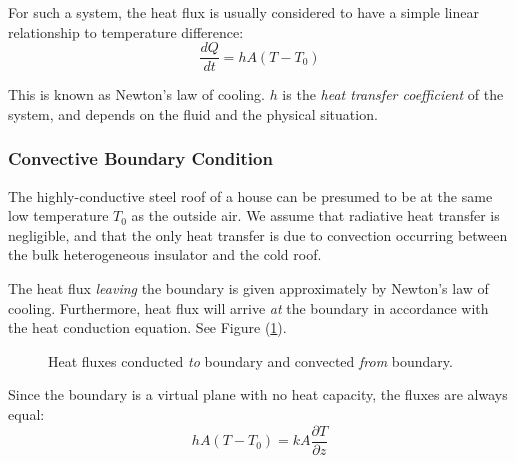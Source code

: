 \documentclass[12pt, a4paper, twoside, openright]{book}
\begin{document}
For such a system, the heat flux is usually considered to have a simple linear relationship to temperature difference:
\begin{equation}
\frac{dQ}{dt} = h A (T - T_0)
\end{equation}

This is known as Newton's law of cooling. $h$ is the \emph{heat transfer coefficient} of the system, and depends on the fluid and the physical situation.

\subsubsection{Convective Boundary Condition}

The highly-conductive steel roof of a house can be presumed to be at the same low temperature $T_0$ as the outside air. We assume that radiative heat transfer is negligible, and that the only heat transfer is due to convection occurring between the bulk heterogeneous insulator and the cold roof. 

The heat flux \emph{leaving} the boundary is given approximately by Newton's law of cooling.
Furthermore, heat flux will arrive \emph{at} the boundary in accordance with the heat conduction equation.  See Figure (\ref{boundaryflux}).

\begin{figure}[ht]
\centering
{}
\caption{Heat fluxes conducted \emph{to} boundary and convected \emph{from} boundary.}\label{boundaryflux}
\end{figure}

Since the boundary is a virtual plane with no heat capacity, the fluxes are always equal:
\begin{equation}
h A (T - T_0) = k A \frac{\partial T}{\partial z}
\end{equation}
\end{document}
